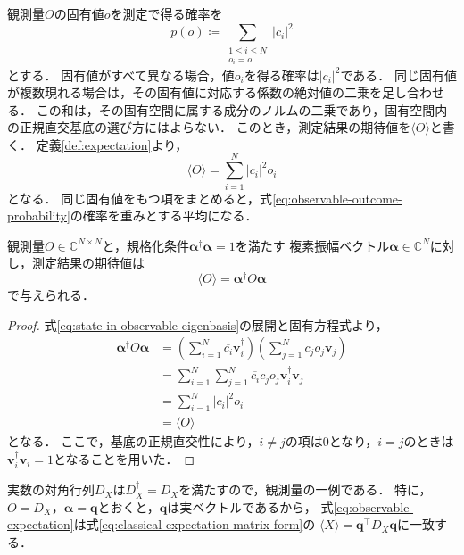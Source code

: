 観測量$O$の固有値$o$を測定で得る確率を
\begin{equation}
  p(o)\coloneq\sum_{\substack{1\leq i\leq N\\o_i=o}}|c_i|^2
  \label{eq:observable-outcome-probability}
\end{equation}
とする．
固有値がすべて異なる場合，値$o_i$を得る確率は$|c_i|^2$である．
同じ固有値が複数現れる場合は，その固有値に対応する係数の絶対値の二乗を足し合わせる．
この和は，その固有空間に属する成分のノルムの二乗であり，固有空間内の正規直交基底の選び方にはよらない．
このとき，測定結果の期待値を$\langle O\rangle$と書く．
定義\ref{def:expectation}より，
\begin{equation}
  \langle O\rangle=\sum_{i=1}^{N}|c_i|^2o_i
  \label{eq:observable-expectation-eigenbasis}
\end{equation}
となる．
同じ固有値をもつ項をまとめると，式\eqref{eq:observable-outcome-probability}の確率を重みとする平均になる．

\begin{prop}[観測量の期待値]
\label{prop:observable-expectation}
観測量$O\in\mathbb C^{N\times N}$と，規格化条件$\bm{\alpha}^{\dagger}\bm{\alpha}=1$を満たす
複素振幅ベクトル$\bm{\alpha}\in\mathbb C^N$に対し，測定結果の期待値は
\begin{equation}
  \langle O\rangle=\bm{\alpha}^{\dagger}O\bm{\alpha}
  \label{eq:observable-expectation}
\end{equation}
で与えられる．
\end{prop}
\begin{proof}
式\eqref{eq:state-in-observable-eigenbasis}の展開と固有方程式より，
\begin{equation*}
  \begin{aligned}
    \bm{\alpha}^{\dagger}O\bm{\alpha}
    &=\left(\sum_{i=1}^{N}\overline{c_i}\bm{v}_i^{\dagger}\right)
      \left(\sum_{j=1}^{N}c_j o_j\bm{v}_j\right)\\
    &=\sum_{i=1}^{N}\sum_{j=1}^{N}
      \overline{c_i}c_j o_j\bm{v}_i^{\dagger}\bm{v}_j\\
    &=\sum_{i=1}^{N}|c_i|^2o_i\\
    &=\langle O\rangle
  \end{aligned}
\end{equation*}
となる．
ここで，基底の正規直交性により，$i\ne j$の項は$0$となり，$i=j$のときは
$\bm{v}_i^{\dagger}\bm{v}_i=1$となることを用いた．
\end{proof}

実数の対角行列$D_X$は$D_X^{\dagger}=D_X$を満たすので，観測量の一例である．
特に，$O=D_X$，$\bm{\alpha}=\bm{q}$とおくと，$\bm{q}$は実ベクトルであるから，
式\eqref{eq:observable-expectation}は式\eqref{eq:classical-expectation-matrix-form}の
$\langle X\rangle=\bm{q}^{\top}D_X\bm{q}$に一致する．

